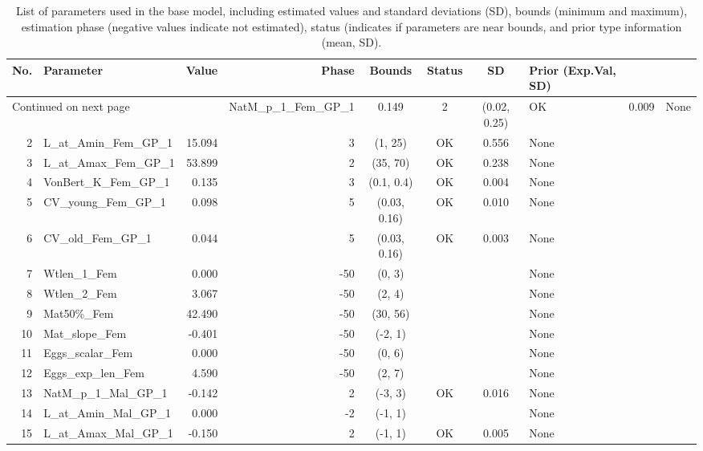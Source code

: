 \documentclass[12pt,]{article}
\begin{document}
\begin{landscape}
\begin{longtable}{rlrrcccl}
\caption{List of parameters used in
                                              the base model, including estimated 
                                              values and standard deviations (SD), 
                                              bounds (minimum and maximum), 
                                              estimation phase (negative values indicate
                                              not estimated), status (indicates if 
                                              parameters are near bounds, and prior type
                                              information (mean, SD).} \\ 
  \hline
No. & Parameter & Value & Phase & Bounds & Status & SD & Prior (Exp.Val, SD)  \\ 
  \hline 
\endhead 
\hline 
\multicolumn{3}{l}{\footnotesize Continued on next page} 
\endfoot 
\endlastfoot 
 \hline
1 & NatM\_p\_1\_Fem\_GP\_1 & 0.149 & 2 & (0.02, 0.25) & OK & 0.009 & None \\ 
  2 & L\_at\_Amin\_Fem\_GP\_1 & 15.094 & 3 & (1, 25) & OK & 0.556 & None \\ 
  3 & L\_at\_Amax\_Fem\_GP\_1 & 53.899 & 2 & (35, 70) & OK & 0.238 & None \\ 
  4 & VonBert\_K\_Fem\_GP\_1 & 0.135 & 3 & (0.1, 0.4) & OK & 0.004 & None \\ 
  5 & CV\_young\_Fem\_GP\_1 & 0.098 & 5 & (0.03, 0.16) & OK & 0.010 & None \\ 
  6 & CV\_old\_Fem\_GP\_1 & 0.044 & 5 & (0.03, 0.16) & OK & 0.003 & None \\ 
  7 & Wtlen\_1\_Fem & 0.000 & -50 & (0, 3) &  &  & None \\ 
  8 & Wtlen\_2\_Fem & 3.067 & -50 & (2, 4) &  &  & None \\ 
  9 & Mat50\%\_Fem & 42.490 & -50 & (30, 56) &  &  & None \\ 
  10 & Mat\_slope\_Fem & -0.401 & -50 & (-2, 1) &  &  & None \\ 
  11 & Eggs\_scalar\_Fem & 0.000 & -50 & (0, 6) &  &  & None \\ 
  12 & Eggs\_exp\_len\_Fem & 4.590 & -50 & (2, 7) &  &  & None \\ 
  13 & NatM\_p\_1\_Mal\_GP\_1 & -0.142 & 2 & (-3, 3) & OK & 0.016 & None \\ 
  14 & L\_at\_Amin\_Mal\_GP\_1 & 0.000 & -2 & (-1, 1) &  &  & None \\ 
  15 & L\_at\_Amax\_Mal\_GP\_1 & -0.150 & 2 & (-1, 1) & OK & 0.005 & None \\ 

\end{longtable}
\end{landscape}
\end{document}
